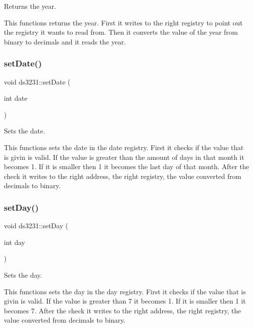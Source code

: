 Returns the year. 

This functions returns the year. First it writes to the right registry to point out the registry it wants to read from. Then it converts the value of the year from binary to decimals and it reads the year. \mbox{\label{classds3231_a9594709f7a4853878efe80f27084e199}} 
\subsubsection{\texorpdfstring{set\+Date()}{setDate()}}
{\footnotesize\ttfamily void ds3231\+::set\+Date (\begin{DoxyParamCaption}\item[{int}]{date }\end{DoxyParamCaption})\hspace{0.3cm}{\ttfamily [inline]}}



Sets the date. 

This functions sets the date in the date registry. First it checks if the value that is givin is valid. If the value is greater than the amount of days in that month it becomes 1. If it is smaller then 1 it becomes the last day of that month. After the check it writes to the right address, the right registry, the value converted from decimals to binary. \mbox{\label{classds3231_ad886fbf5b85fad7eeb44fc3be689535a}} 
\subsubsection{\texorpdfstring{set\+Day()}{setDay()}}
{\footnotesize\ttfamily void ds3231\+::set\+Day (\begin{DoxyParamCaption}\item[{int}]{day }\end{DoxyParamCaption})\hspace{0.3cm}{\ttfamily [inline]}}



Sets the day. 

This functions sets the day in the day registry. First it checks if the value that is givin is valid. If the value is greater than 7 it becomes 1. If it is smaller then 1 it becomes 7. After the check it writes to the right address, the right registry, the value converted from decimals to binary. \mbox{\label{classds3231_a94cb9847db3e8f0072e6aad1df481164}} 
